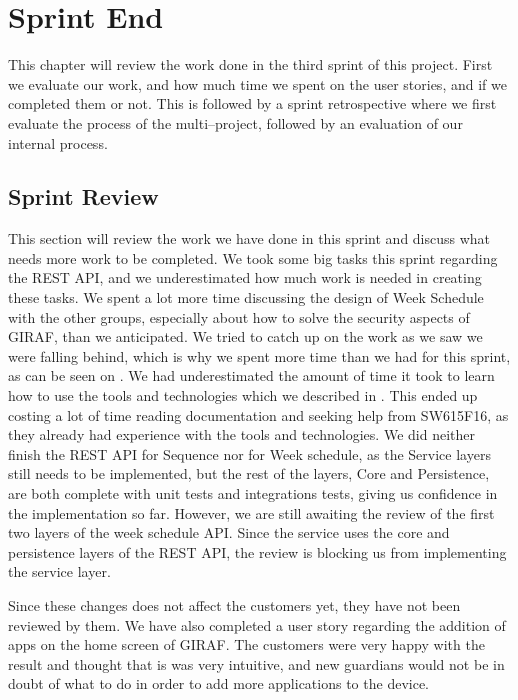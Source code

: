 \chapter{Sprint End}
This chapter will review the work done in the third sprint of this project.
First we evaluate our work, and how much time we spent on the user stories, and if we completed them or not.
This is followed by a sprint retrospective where we first evaluate the process of the multi--project, followed by an evaluation of our internal process.

\section{Sprint Review}\label{sec:sprintreview3}
This section will review the work we have done in this sprint and discuss what needs more work to be completed.
We took some big tasks this sprint regarding the REST API, and we underestimated how much work is needed in creating these tasks.
We spent a lot more time discussing the design of Week Schedule with the other groups, especially about how to solve the security aspects of GIRAF, than we anticipated.
We tried to catch up on the work as we saw we were falling behind, which is why we spent more time than we had for this sprint, as can be seen on .
We had underestimated the amount of time it took to learn how to use the tools and technologies which we described in .
This ended up costing a lot of time reading documentation and seeking help from SW615F16, as they already had experience with the tools and technologies.
We did neither finish the REST API for Sequence nor for Week schedule, as the Service layers still needs to be implemented, but the rest of the layers, Core and Persistence, are both complete with unit tests and integrations tests, giving us confidence in the implementation so far.
However, we are still awaiting the review of the first two layers of the week schedule API.
Since the service uses the core and persistence layers of the REST API, the review is blocking us from implementing the service layer.

Since these changes does not affect the customers yet, they have not been reviewed by them.
We have also completed a user story regarding the addition of apps on the home screen of GIRAF.
The customers were very happy with the result and thought that is was very intuitive, and new guardians would not be in doubt of what to do in order to add more applications to the device.

